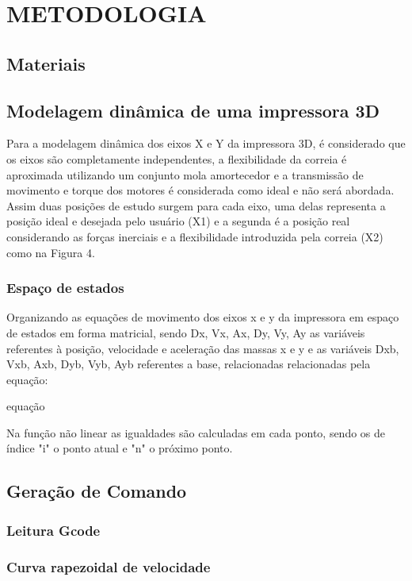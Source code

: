 \chapter{METODOLOGIA}

\section{Materiais}

\section{Modelagem dinâmica de uma impressora 3D}
Para a modelagem dinâmica dos eixos X e Y da impressora 3D, 
é considerado que os eixos são completamente independentes, 
a flexibilidade da correia é aproximada utilizando um conjunto 
mola amortecedor e a transmissão de movimento e torque dos 
motores é considerada como ideal e não será abordada.
Assim duas posições de estudo surgem para cada eixo, uma delas 
representa a posição ideal e desejada pelo usuário (X1) e a 
segunda é a posição real considerando as forças inerciais e a 
flexibilidade introduzida pela correia (X2) como na Figura 4.

\subsection{Espaço de estados}
Organizando as equações de movimento dos eixos x e y da 
impressora em espaço de estados em forma matricial, sendo 
Dx, Vx, Ax, Dy, Vy, Ay as variáveis referentes à posição,
velocidade e aceleração das massas x e y e as variáveis Dxb, 
Vxb, Axb, Dyb, Vyb, Ayb referentes a base, relacionadas 
relacionadas pela equação:

equação

Na função não linear as igualdades são calculadas em cada ponto, 
sendo os de índice "i" o ponto atual e "n" o próximo ponto.

\section{Geração de Comando}

\subsection{Leitura Gcode}
\subsection{Curva rapezoidal de velocidade}
